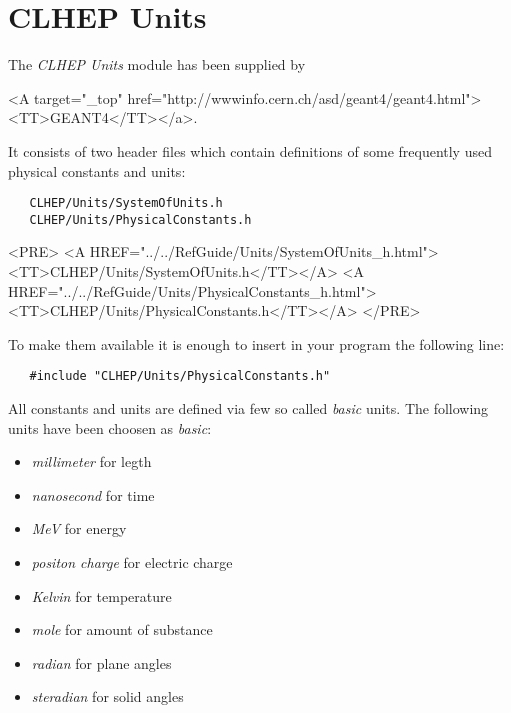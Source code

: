 
\newcommand{\lbar}
           {\makebox[0mm][l]{\hspace{.1em}\rule[.9ex]{.4em}{.4pt}}\lambda}

\section*{CLHEP Units}

The {\it CLHEP Units} module has been supplied by 
\begin{rawhtml}
<A target="_top" href="http://wwwinfo.cern.ch/asd/geant4/geant4.html">
<TT>GEANT4</TT></a>.
\end{rawhtml}
It consists of two header files which contain definitions of some frequently
used physical constants and units:
\begin{latexonly}
\begin{verbatim}
   CLHEP/Units/SystemOfUnits.h
   CLHEP/Units/PhysicalConstants.h
\end{verbatim}
\end{latexonly}
\begin{rawhtml}
<PRE>
   <A HREF="../../RefGuide/Units/SystemOfUnits_h.html"><TT>CLHEP/Units/SystemOfUnits.h</TT></A>
   <A HREF="../../RefGuide/Units/PhysicalConstants_h.html"><TT>CLHEP/Units/PhysicalConstants.h</TT></A>
</PRE>
\end{rawhtml}

To make them available it is enough to insert in your program the following
line:
\begin{verbatim}
   #include "CLHEP/Units/PhysicalConstants.h"
\end{verbatim}

All constants and units are defined via few so called {\it basic} units.
The following units have been choosen as {\it basic}:
\begin{itemize}
\item {\it millimeter} for legth
\item {\it nanosecond} for time
\item {\it MeV} for energy
\item {\it positon charge} for electric charge
\item {\it Kelvin} for temperature
\item {\it mole} for amount of substance 
\item {\it radian} for plane angles
\item {\it steradian} for solid angles
\end{itemize}

